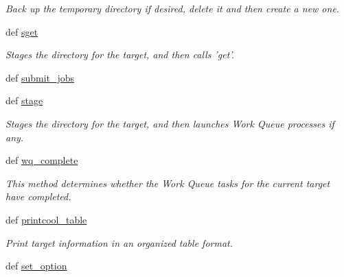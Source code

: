 \begin{DoxyCompactItemize}
\begin{DoxyCompactList}\small\item\em Back up the temporary directory if desired, delete it and then create a new one. \end{DoxyCompactList}\item 
def \hyperlink{classforcebalance_1_1target_1_1Target_a51d58b55242bf4d4909c1837174f5f3c}{sget}
\begin{DoxyCompactList}\small\item\em Stages the directory for the target, and then calls 'get'. \end{DoxyCompactList}\item 
def \hyperlink{classforcebalance_1_1target_1_1Target_a78cd29b94cbcc201eed99c78aaef46a4}{submit\-\_\-jobs}
\item 
def \hyperlink{classforcebalance_1_1target_1_1Target_af8d2a4658c87841e40296795aec478bb}{stage}
\begin{DoxyCompactList}\small\item\em Stages the directory for the target, and then launches Work Queue processes if any. \end{DoxyCompactList}\item 
def \hyperlink{classforcebalance_1_1target_1_1Target_af6099ec09486213869dba2491bd8ea04}{wq\-\_\-complete}
\begin{DoxyCompactList}\small\item\em This method determines whether the Work Queue tasks for the current target have completed. \end{DoxyCompactList}\item 
def \hyperlink{classforcebalance_1_1target_1_1Target_ac30a4e9d7d9fe06f7caefa5f7cfab09b}{printcool\-\_\-table}
\begin{DoxyCompactList}\small\item\em Print target information in an organized table format. \end{DoxyCompactList}\item 
def \hyperlink{classforcebalance_1_1baseclass_1_1ForceBalanceBaseClass_abaaf4d99b043d41f02fabc41db59252b}{set\-\_\-option}
\end{DoxyCompactItemize}
